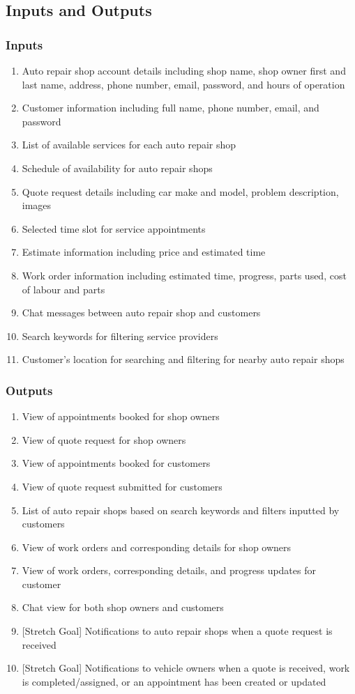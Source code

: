 \documentclass{article}
\begin{document}
\subsection{Inputs and Outputs}
\subsubsection{Inputs}
\begin{enumerate}
    \item Auto repair shop account details including shop name, shop owner first and last name, address, phone number, email, password, and hours of operation
    \item Customer information including full name, phone number, email, and password
    \item List of available services for each auto repair shop
    \item Schedule of availability for auto repair shops
    \item Quote request details including car make and model, problem description, images
    \item Selected time slot for service appointments
    \item Estimate information including price and estimated time
    \item Work order information including estimated time, progress, parts used, cost of labour and parts
    \item Chat messages between auto repair shop and customers
    \item Search keywords for filtering service providers
    \item Customer's location for searching and filtering for nearby auto repair shops
\end{enumerate}
\subsubsection{Outputs}
\begin{enumerate}
    \item View of appointments booked for shop owners
    \item View of quote request for shop owners
    \item View of appointments booked for customers
    \item View of quote request submitted for customers
    \item List of auto repair shops based on search keywords and filters inputted by customers
    \item View of work orders and corresponding details for shop owners
    \item View of work orders, corresponding details, and progress updates for customer
    \item Chat view for both shop owners and customers
    \item {[Stretch Goal]} Notifications to auto repair shops when a quote request is received
    \item {[Stretch Goal]} Notifications to vehicle owners when a quote is received, work is completed/assigned, 
    or an appointment has been created or updated
\end{enumerate}
\end{document}
